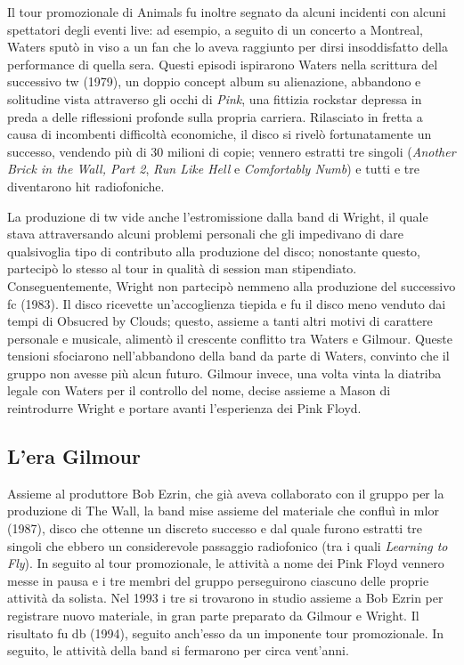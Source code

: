 \documentclass[class=book, crop=false, oneside, 12pt]{standalone}
\begin{document}
    Il tour promozionale di Animals fu inoltre segnato da alcuni incidenti con alcuni spettatori degli eventi live: ad esempio, a seguito di un concerto a Montreal, Waters sputò in viso a un fan che lo aveva raggiunto per dirsi insoddisfatto della performance di quella sera. Questi episodi ispirarono Waters nella scrittura del successivo \acrfull{tw} (1979), un doppio concept album su alienazione, abbandono e solitudine vista attraverso gli occhi di \emph{Pink}, una fittizia rockstar depressa in preda a delle riflessioni profonde sulla propria carriera. Rilasciato in fretta a causa di incombenti difficoltà economiche, il disco si rivelò fortunatamente un successo, vendendo più di 30 milioni di copie; vennero estratti tre singoli (\emph{Another Brick in the Wall, Part 2}, \emph{Run Like Hell} e \emph{Comfortably Numb}) e tutti e tre diventarono hit radiofoniche. 
    
    La produzione di \acrshort{tw} vide anche l'estromissione dalla band di Wright, il quale stava attraversando alcuni problemi personali che gli impedivano di dare qualsivoglia tipo di contributo alla produzione del disco; nonostante questo, partecipò lo stesso al tour in qualità di session man stipendiato. Conseguentemente, Wright non partecipò nemmeno alla produzione del successivo \acrfull{fc} (1983). Il disco ricevette un'accoglienza tiepida e fu il disco meno venduto dai tempi di Obsucred by Clouds; questo, assieme a tanti altri motivi di carattere personale e musicale, alimentò il crescente conflitto tra Waters e Gilmour. Queste tensioni sfociarono nell'abbandono della band da parte di Waters, convinto che il gruppo non avesse più alcun futuro. Gilmour invece, una volta vinta la diatriba legale con Waters per il controllo del nome, decise assieme a Mason di reintrodurre Wright e portare avanti l'esperienza dei Pink Floyd.

    \subsection{L'era Gilmour}
    Assieme al produttore Bob Ezrin, che già aveva collaborato con il gruppo per la produzione di The Wall, la band mise assieme del materiale che confluì in \acrfull{mlor} (1987), disco che ottenne un discreto successo e dal quale furono estratti tre singoli che ebbero un considerevole passaggio radiofonico (tra i quali \emph{Learning to Fly}). In seguito al tour promozionale, le attività a nome dei Pink Floyd vennero messe in pausa  e i tre membri del gruppo perseguirono ciascuno delle proprie attività da solista. Nel 1993 i tre si trovarono in studio assieme a Bob Ezrin per registrare nuovo materiale, in gran parte preparato da Gilmour e Wright. Il risultato fu \acrfull{db} (1994), seguito anch'esso da un imponente tour promozionale. In seguito, le attività della band si fermarono per circa vent'anni.
\end{document}

